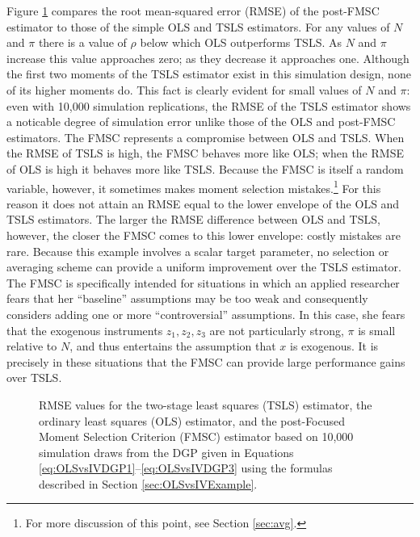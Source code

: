 Figure \ref{fig:OLSvsIV_RMSEbaseline} compares the root mean-squared error (RMSE) of the post-FMSC estimator to those of the simple OLS and TSLS estimators.
For any values of $N$ and $\pi$ there is a value of $\rho$ below which OLS outperforms TSLS. 
As $N$ and $\pi$ increase this value approaches zero; as they decrease it approaches one.
Although the first two moments of the TSLS estimator exist in this simulation design, none of its higher moments do. 
This fact is clearly evident for small values of $N$ and $\pi$: even with 10,000 simulation replications, the RMSE of the TSLS estimator shows a noticable degree of simulation error unlike those of the OLS and post-FMSC estimators.
The FMSC represents a compromise between OLS and TSLS.
When the RMSE of TSLS is high, the FMSC behaves more like OLS; when the RMSE of OLS is high it behaves more like TSLS.
Because the FMSC is itself a random variable, however, it sometimes makes moment selection mistakes.\footnote{For more discussion of this point, see Section \ref{sec:avg}.} 
For this reason it does not attain an RMSE equal to the lower envelope of the OLS and TSLS estimators.
The larger the RMSE difference between OLS and TSLS, however, the closer the FMSC comes to this lower envelope: costly mistakes are rare.
Because this example involves a scalar target parameter, no selection or averaging scheme can provide a uniform improvement over the TSLS estimator.
The FMSC is specifically intended for situations in which an applied researcher fears that her ``baseline'' assumptions may be too weak and consequently considers adding one or more ``controversial'' assumptions.
In this case, she fears that the exogenous instruments $z_1, z_2, z_3$ are not particularly strong, $\pi$ is small relative to $N$, and thus entertains the assumption that $x$ is exogenous.
It is precisely in these situations that the FMSC can provide large performance gains over TSLS.

\begin{figure}
\centering
	
	\caption{RMSE values for the two-stage least squares (TSLS) estimator, the ordinary least squares (OLS) estimator, and the post-Focused Moment Selection Criterion (FMSC) estimator based on 10,000 simulation draws from the DGP given in Equations \ref{eq:OLSvsIVDGP1}--\ref{eq:OLSvsIVDGP3} using the formulas described in Section \ref{sec:OLSvsIVExample}.}
	\label{fig:OLSvsIV_RMSEbaseline}
\end{figure}

